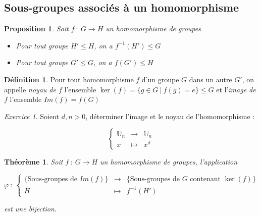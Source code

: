 \documentclass[]{article}
\newtheorem{mythm}{Théorème}
\newtheorem{myproposition}{Proposition}
\theoremstyle{remark}
\newtheorem{myexer}{Exercice}
\theoremstyle{definition}
\newtheorem{mydef}{Définition}
\newcommand{\funcshort}[3]{
#1 ~ : ~ #2 \longrightarrow #3
}
\begin{document}
\subsection{Sous-groupes associés à un homomorphisme}

\begin{myproposition}
	Soit $\funcshort{f}{G}{H}$ un homomorphisme de groupes
	\begin{itemize}
		\item Pour tout groupe $H' \leqslant H$, on a $f^{-1}(H') \leqslant G$
		
		\item Pour tout groupe $G' \leqslant G$, on a $f(G') \leqslant H$
	\end{itemize}
\end{myproposition}

\begin{mydef}
	Pour tout homomorphisme $f$ d'un groupe $G$ dans un autre $G'$, on appelle \textit{noyau de $f$} l'ensemble $\ker(f)=\{g \in G ~ | ~ f(g) = e\} \leqslant G$ et l'\textit{image de $f$} l'ensemble $Im(f)=f(G)$
\end{mydef}

\begin{myexer}
	Soient $d, n > 0$, déterminer l'image et le noyau de l'homomorphisme :
	
	$$\left\{
		\begin{array}{ccc}
			\mathbb{U}_n & \longrightarrow & \mathbb{U}_n \\
			x & \longmapsto & x^d
		\end{array}
	\right.$$
\end{myexer}

\begin{mythm}
	Soit $\funcshort{f}{G}{H}$ un homomorphisme de groupes, l'application
	
	$$\varphi ~ : ~ \left\{\begin{array}{rcl}
		\{\text{Sous-groupes de } Im(f)\} & \longrightarrow & \{\text{Sous-groupes de } G \text{ contenant }\ker(f)\} \\
		H & \longmapsto & f^{-1}(H')
	\end{array}\right.$$
	
	est une bijection.
\end{mythm}
\end{document}
